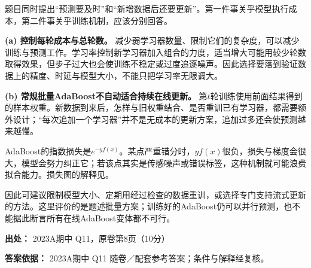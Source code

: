 题目同时提出“预测要及时”和“新增数据后还要更新”。第一件事关乎模型执行成本，第二件事关乎训练机制，应该分别回答。


\textbf{(a) 控制每轮成本与总轮数。} 减少弱学习器数量、限制它们的复杂度，可以减少训练与预测工作。学习率控制新学习器加入组合的力度，适当增大可能用较少轮数取得效果，但步子过大也会使训练不稳定或过度追逐噪声。因此选择要落到验证数据上的精度、时延与模型大小，不能只把学习率无限调大。


\textbf{(b) 常规批量AdaBoost不自动适合持续在线更新。} 第\(t\)轮训练使用前面结果得到的样本权重。新数据到来后，怎样与旧权重结合、是否重训已有学习器，都需要额外设计；“每次追加一个学习器”并不是无成本的更新方案，追加过多还会使预测越来越慢。


AdaBoost的指数损失是\(e^{-yf(x)}\)。某点严重错分时，\(yf(x)\)很负，损失与梯度会很大，模型会努力纠正它；若该点其实是传感噪声或错误标签，这种机制就可能浪费拟合能力。损失图的解释见。


因此可建议限制模型大小、定期用经过检查的数据重训，或选择专门支持流式更新的方法。这里评价的是题述批量方案；训练好的AdaBoost仍可以并行预测，也不能据此断言所有在线AdaBoost变体都不可行。


\textbf{出处：} 2023A期中 Q11，原卷第8页（10分）


\textbf{答案依据：} 2023A期中 Q11 随卷／配套参考答案；条件与解释经复核。
